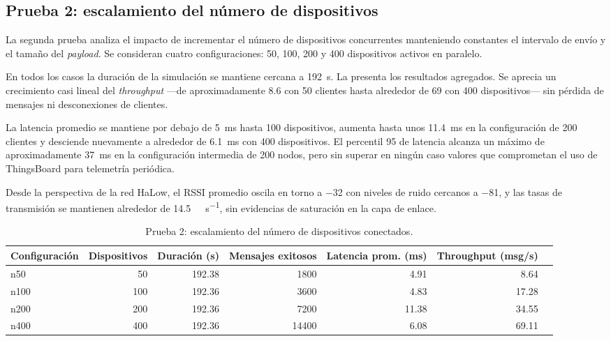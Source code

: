 \subsection{Prueba 2: escalamiento del n\'umero de dispositivos}
La segunda prueba analiza el impacto de incrementar el n\'umero de dispositivos concurrentes manteniendo constantes el intervalo de env\'io y el tama\~no del \emph{payload}. Se consideran cuatro configuraciones: \num{50}, \num{100}, \num{200} y \num{400} dispositivos activos en paralelo.

En todos los casos la duraci\'on de la simulaci\'on se mantiene cercana a \num{192}~\si{\second}. La  presenta los resultados agregados. Se aprecia un crecimiento casi lineal del \emph{throughput} ---de aproximadamente \SI{8.6}{} con \num{50} clientes hasta alrededor de \SI{69}{} con \num{400} dispositivos--- sin p\'erdida de mensajes ni desconexiones de clientes.

La latencia promedio se mantiene por debajo de \SI{5}{\milli\second} hasta \num{100} dispositivos, aumenta hasta unos \SI{11.4}{\milli\second} en la configuraci\'on de \num{200} clientes y desciende nuevamente a alrededor de \SI{6.1}{\milli\second} con \num{400} dispositivos. El percentil 95 de latencia alcanza un m\'aximo de aproximadamente \SI{37}{\milli\second} en la configuraci\'on intermedia de \num{200} nodos, pero sin superar en ning\'un caso valores que comprometan el uso de ThingsBoard para telemetr\'ia peri\'odica.

Desde la perspectiva de la red HaLow, el RSSI promedio oscila en torno a \SI{-32}{\decibelm} con niveles de ruido cercanos a \SI{-81}{\decibelm}, y las tasas de transmisi\'on se mantienen alrededor de \SI{14.5}{\mega\bit\per\second}, sin evidencias de saturaci\'on en la capa de enlace.

\begin{table}[!t]
\centering
\caption{Prueba 2: escalamiento del n\'umero de dispositivos conectados.}
\label{tab:prueba2}
\begin{tabular}{@{}lrrrrrr@{}}
\toprule
Configuraci\'on & Dispositivos & Duraci\'on (s) & Mensajes exitosos & Latencia prom. (ms) & Throughput (msg/s) \\
\midrule
n50  &  50 & 192.38 &  1800 &  4.91 &  8.64 \\
n100 & 100 & 192.36 &  3600 &  4.83 & 17.28 \\
n200 & 200 & 192.36 &  7200 & 11.38 & 34.55 \\
n400 & 400 & 192.36 & 14400 &  6.08 & 69.11 \\
\bottomrule
\end{tabular}
\end{table}

